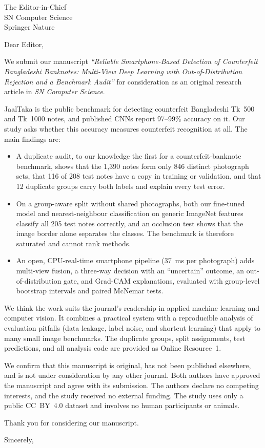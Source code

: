 \documentclass[10pt]{letter}
\date{\today}
\begin{document}
\begin{letter}{The Editor-in-Chief\\
SN Computer Science\\
Springer Nature}

\opening{Dear Editor,}

We submit our manuscript \emph{``Reliable Smartphone-Based Detection of Counterfeit
Bangladeshi Banknotes: Multi-View Deep Learning with Out-of-Distribution Rejection and a
Benchmark Audit''} for consideration as an original research article in
\emph{SN Computer Science}.

JaalTaka is the public benchmark for detecting counterfeit Bangladeshi Tk~500 and
Tk~1000 notes, and published CNNs report 97--99\% accuracy on it. Our study asks whether
this accuracy measures counterfeit recognition at all. The main findings are:

\begin{itemize}
\item A duplicate audit, to our knowledge the first for a counterfeit-banknote benchmark,
shows that the 1{,}390 notes form only 846 distinct photograph sets, that 116 of 208
test notes have a copy in training or validation, and that 12 duplicate groups carry
both labels and explain every test error.
\item On a group-aware split without shared photographs, both our fine-tuned model and
nearest-neighbour classification on generic ImageNet features classify all 205 test
notes correctly, and an occlusion test shows that the image border alone separates the
classes. The benchmark is therefore saturated and cannot rank methods.
\item An open, CPU-real-time smartphone pipeline (37~ms per photograph) adds multi-view
fusion, a three-way decision with an ``uncertain'' outcome, an out-of-distribution gate,
and Grad-CAM explanations, evaluated with group-level bootstrap intervals and paired
McNemar tests.
\end{itemize}

We think the work suits the journal's readership in applied machine learning and
computer vision. It combines a practical system with a reproducible analysis of
evaluation pitfalls (data leakage, label noise, and shortcut learning) that apply to
many small image benchmarks. The duplicate groups, split assignments, test predictions,
and all analysis code are provided as Online Resource~1.

We confirm that this manuscript is original, has not been published elsewhere, and is
not under consideration by any other journal. Both authors have approved the manuscript
and agree with its submission. The authors declare no competing interests, and the study
received no external funding. The study uses only a public CC~BY~4.0 dataset and
involves no human participants or animals.

Thank you for considering our manuscript.

\closing{Sincerely,}

\end{letter}
\end{document}
